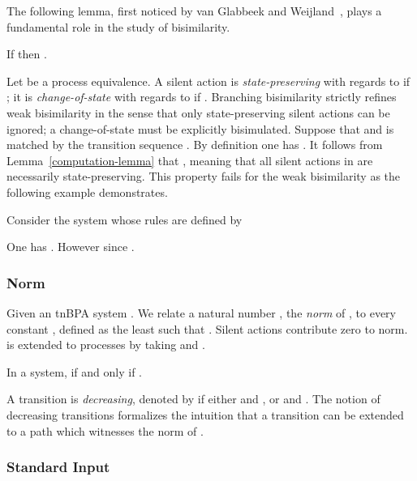 \documentclass{llncs}
\begin{document}
The following lemma, first noticed by van Glabbeek and Weijland~\cite{GlabbeekW96}, plays a fundamental role in the study of bisimilarity.
\begin{lemma}\label{computation-lemma}
If  then .
\end{lemma}

Let  be a process equivalence.
A silent action  is {\em state-preserving} with regards to  if ;
it is {\em change-of-state} with regards to  if .
Branching bisimilarity strictly refines weak bisimilarity in the sense that only state-preserving silent actions can be ignored; a change-of-state must be explicitly bisimulated.
Suppose that  and  is matched by the transition sequence .
By definition one has .
It follows from Lemma~\ref{computation-lemma} that , meaning that all silent actions in  are necessarily state-preserving.  This property fails for the weak bisimilarity as the following example demonstrates.
\begin{example}\label{example}
Consider the  system whose rules are defined by

One has .
However  since .
\end{example}




\subsubsection{Norm}
Given an tnBPA system .
We relate a natural number , the {\em norm} of , to every constant , defined as the least  such that .  Silent actions contribute zero to norm.    is extended to processes by taking  and .

\begin{lemma}\label{lem:normal_one}
In a  system,  if and only if .
\end{lemma}

A transition  is {\em decreasing}, denoted by  if either
 and , or
 and .  The notion of
decreasing transitions formalizes the intuition that a transition can be extended to a path which witnesses the norm of .




\subsubsection{Standard Input}
\end{document}
